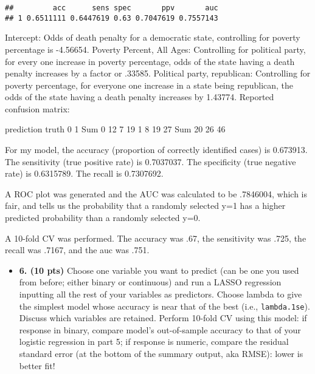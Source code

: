 \documentclass[]{article}
\newenvironment{Shaded}{\begin{snugshade}}{\end{snugshade}}
\newcommand{\DataTypeTok}[1]{\textcolor[rgb]{0.13,0.29,0.53}{#1}}
\newcommand{\DecValTok}[1]{\textcolor[rgb]{0.00,0.00,0.81}{#1}}
\newcommand{\KeywordTok}[1]{\textcolor[rgb]{0.13,0.29,0.53}{\textbf{#1}}}
\newcommand{\NormalTok}[1]{#1}
\newcommand{\OperatorTok}[1]{\textcolor[rgb]{0.81,0.36,0.00}{\textbf{#1}}}
\newcommand{\StringTok}[1]{\textcolor[rgb]{0.31,0.60,0.02}{#1}}
\providecommand{\tightlist}{%
  \setlength{\itemsep}{0pt}\setlength{\parskip}{0pt}}
\begin{document}
\begin{verbatim}
##         acc      sens spec       ppv       auc
## 1 0.6511111 0.6447619 0.63 0.7047619 0.7557143
\end{verbatim}

Intercept: Odds of death penalty for a democratic state, controlling for
poverty percentage is -4.56654. Poverty Percent, All Ages: Controlling
for political party, for every one increase in poverty percentage, odds
of the state having a death penalty increases by a factor or .33585.
Political party, republican: Controlling for poverty percentage, for
everyone one increase in a state being republican, the odds of the state
having a death penalty increases by 1.43774. Reported confusion matrix:

prediction truth 0 1 Sum 0 12 7 19 1 8 19 27 Sum 20 26 46

For my model, the accuracy (proportion of correctly identified cases) is
0.673913. The sensitivity (true positive rate) is 0.7037037. The
specificity (true negative rate) is 0.6315789. The recall is 0.7307692.

A ROC plot was generated and the AUC was calculated to be .7846004,
which is fair, and tells us the probability that a randomly selected y=1
has a higher predicted probability than a randomly selected y=0.

A 10-fold CV was performed. The accuracy was .67, the sensitivity was
.725, the recall was .7167, and the auc was .751.

\begin{itemize}
\tightlist
\item
  \textbf{6. (10 pts)} Choose one variable you want to predict (can be
  one you used from before; either binary or continuous) and run a LASSO
  regression inputting all the rest of your variables as predictors.
  Choose lambda to give the simplest model whose accuracy is near that
  of the best (i.e., \texttt{lambda.1se}). Discuss which variables are
  retained. Perform 10-fold CV using this model: if response in binary,
  compare model's out-of-sample accuracy to that of your logistic
  regression in part 5; if response is numeric, compare the residual
  standard error (at the bottom of the summary output, aka RMSE): lower
  is better fit!
\end{itemize}

\begin{Shaded}
\end{Shaded}
\end{document}
